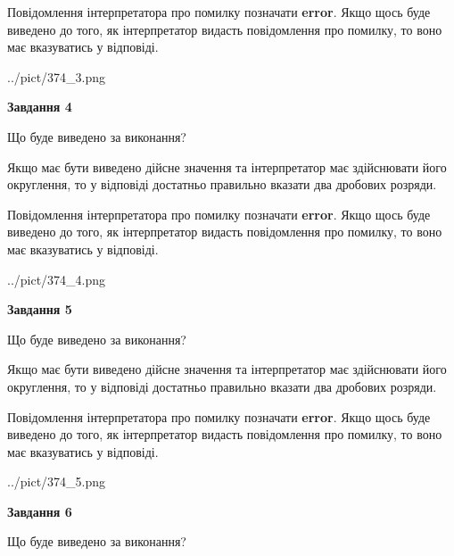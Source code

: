 \documentclass[12pt, ukrainian]{article}
\begin{document}
{\begin {Large}
Повідомлення інтерпретатора про помилку позначати \textbf{error}.
Якщо щось буде виведено до того, як інтерпретатор видасть повідомлення про помилку, 
то воно має вказуватись у відповіді. \par

\begin{center}
	{../pict/374_3.png}
\end{center}
\newpage

{\begin {center}\textbf{Завдання 4}\end {center}}\par
Що буде виведено за виконання? \par

Якщо має бути виведено дійсне значення та інтерпретатор має здійснювати його округлення, 
то у відповіді достатньо правильно вказати два дробових розряди.

Повідомлення інтерпретатора про помилку позначати \textbf{error}.
Якщо щось буде виведено до того, як інтерпретатор видасть повідомлення про помилку, 
то воно має вказуватись у відповіді. \par

\begin{center}
	{../pict/374_4.png}
\end{center}
\newpage

{\begin {center}\textbf{Завдання 5}\end {center}}\par
Що буде виведено за виконання? \par

Якщо має бути виведено дійсне значення та інтерпретатор має здійснювати його округлення, 
то у відповіді достатньо правильно вказати два дробових розряди.

Повідомлення інтерпретатора про помилку позначати \textbf{error}.
Якщо щось буде виведено до того, як інтерпретатор видасть повідомлення про помилку, 
то воно має вказуватись у відповіді. \par

\begin{center}
	{../pict/374_5.png}
\end{center}
\newpage

{\begin {center}\textbf{Завдання 6}\end {center}}\par
Що буде виведено за виконання? \par


\end{Large}}
\end{document}
